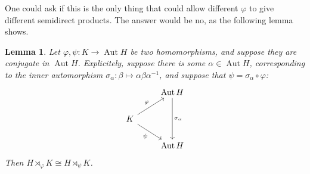 \documentclass[11pt]{article}
\newtheorem{lemma}[theorem]{Lemma}
\newcommand{\Aut}{\operatorname{Aut}}
\begin{document}
One could ask if this is the only thing that could allow different $\varphi$ to give different semidirect products.  The answer would be no, as the following lemma shows.
\begin{lemma}\label{rightSemidirect}
  Let $\varphi,\psi:K\to\Aut H$ be two homomorphisms, and suppose they are conjugate in $\Aut H$.  Explicitely, suppose there is some $\alpha\in\Aut H$, corresponding to the inner automorphism $\sigma_\alpha:\beta\mapsto \alpha\beta\alpha^{-1}$, and suppose that $\psi = \sigma_\alpha\circ\varphi$:
  \[
  \begin{tikzcd}
    &\Aut H\ar[dd,"\sigma_\alpha"]\\
    K\ar[ur,"\varphi"]\ar[dr,swap,"\psi"]\\
    &\Aut H
  \end{tikzcd}
  \]
  Then $H\rtimes_\varphi K\cong H\rtimes_\psi K$.
\end{lemma}
\end{document}
